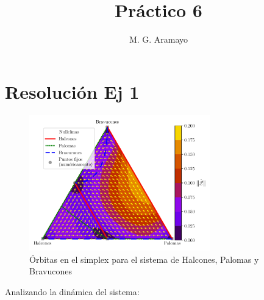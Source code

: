 \documentclass[twocolumn,aps,prl]{revtex4-1}
\begin{document}

\title{Práctico 6}
\author{M. G. Aramayo}


\maketitle

\section{Resolución Ej 1}


\begin{figure}[ht!]
    \centering
        \includegraphics[width = 0.7\textwidth]{figuras/ex01-a.pdf}
    \caption{Órbitas en el simplex para el sistema de Halcones, Palomas y Bravucones}
    \label{fig:figuras/ex01-a}
\end{figure}


Analizando la dinámica del sistema:
\end{document}
